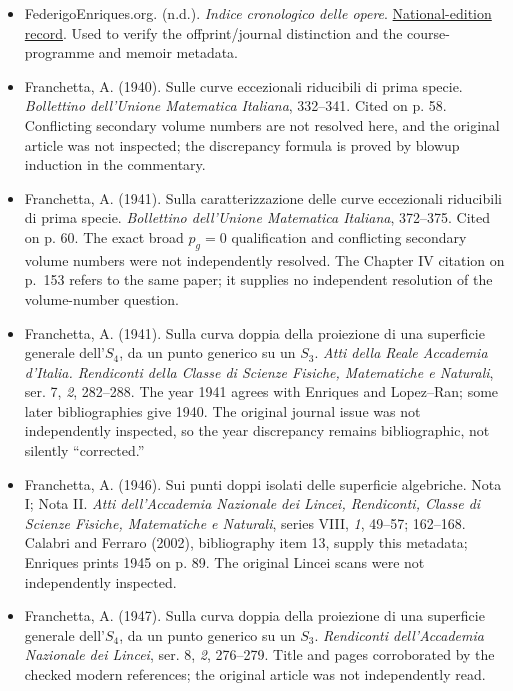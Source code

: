 \begin{sloppypar}
\begin{itemize}
\item FederigoEnriques.org. (n.d.). \emph{Indice cronologico delle opere}. \href{https://www.federigoenriques.org/indice-cronologico-delle-opere/}{National-edition record}. Used to verify the offprint/journal distinction and the course-programme and memoir metadata.

\item Franchetta, A. (1940). Sulle curve eccezionali riducibili di prima specie. \emph{Bollettino dell'Unione Matematica Italiana}, 332--341. Cited on p. 58. Conflicting secondary volume numbers are not resolved here, and the original article was not inspected; the discrepancy formula is proved by blowup induction in the commentary.

\item Franchetta, A. (1941). Sulla caratterizzazione delle curve eccezionali riducibili di prima specie. \emph{Bollettino dell'Unione Matematica Italiana}, 372--375. Cited on p. 60. The exact broad \(p_g=0\) qualification and conflicting secondary volume numbers were not independently resolved. The Chapter IV citation on p.~153 refers to the same paper; it supplies no independent resolution of the volume-number question.

\item Franchetta, A. (1941). Sulla curva doppia della proiezione di una superficie generale dell'\(S_4\), da un punto generico su un \(S_3\). \emph{Atti della Reale Accademia d'Italia. Rendiconti della Classe di Scienze Fisiche, Matematiche e Naturali}, ser. 7, \emph{2}, 282--288. The year 1941 agrees with Enriques and Lopez--Ran; some later bibliographies give 1940. The original journal issue was not independently inspected, so the year discrepancy remains bibliographic, not silently ``corrected.''

\item Franchetta, A. (1946). Sui punti doppi isolati delle superficie algebriche. Nota I; Nota II. \emph{Atti dell'Accademia Nazionale dei Lincei, Rendiconti, Classe di Scienze Fisiche, Matematiche e Naturali}, series VIII, \emph{1}, 49--57; 162--168. Calabri and Ferraro (2002), bibliography item 13, supply this metadata; Enriques prints 1945 on p. 89. The original Lincei scans were not independently inspected.

\item Franchetta, A. (1947). Sulla curva doppia della proiezione di una superficie generale dell'\(S_4\), da un punto generico su un \(S_3\). \emph{Rendiconti dell'Accademia Nazionale dei Lincei}, ser. 8, \emph{2}, 276--279. Title and pages corroborated by the checked modern references; the original article was not independently read.


\end{itemize}
\end{sloppypar}

